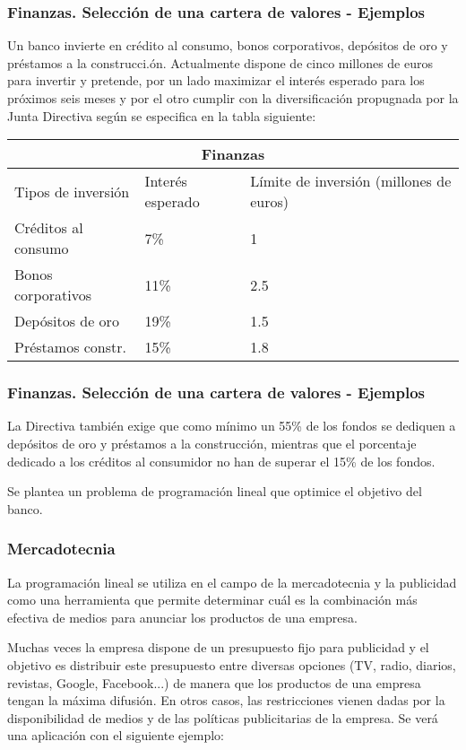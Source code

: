 \documentclass{beamer}
\begin{document}
\begin{frame}
\frametitle{Finanzas. Selecci\'on de una cartera de valores - Ejemplos}
Un banco invierte en cr\'edito al consumo, bonos corporativos, dep\'ositos de oro y pr\'estamos a la construcci.\'on. Actualmente dispone de cinco millones de euros para invertir y pretende, por un lado maximizar el inter\'es esperado para los pr\'oximos seis meses y por el otro cumplir con la diversificaci\'on propugnada por la Junta Directiva seg\'un se especifica en la tabla siguiente:

\begin{tabular}{ |p{3.3cm}||p{3cm}|p{3cm}|  }
 \hline
 \multicolumn{3}{|c|}{Finanzas} \\
 \hline
 Tipos de inversi\'on& Inter\'es esperado &L\'imite de inversi\'on (millones de euros)\\
 \hline
 Cr\'editos al consumo   & 7\%    &1\\
 Bonos corporativos   & 11\%    &2.5\\
 Dep\'ositos de oro   & 19\%    &1.5\\
 Pr\'estamos constr. & 15\%    &1.8\\
    \hline
\end{tabular}

\end{frame}


\begin{frame}
\frametitle{Finanzas. Selecci\'on de una cartera de valores - Ejemplos}

La Directiva tambi\'en exige que como m\'inimo un 55\% de los fondos se dediquen a dep\'ositos de oro y pr\'estamos a la construcci\'on, mientras que el porcentaje dedicado a los cr\'editos al consumidor no han de superar el 15\% de los fondos.

Se plantea un problema de programaci\'on lineal que optimice el objetivo del banco.
\end{frame}


\begin{frame}
\frametitle{Mercadotecnia}


La programaci\'on lineal se utiliza en el campo de la mercadotecnia y la publicidad como una herramienta que permite determinar cu\'al es la combinaci\'on m\'as efectiva de medios para anunciar los productos de una empresa.

Muchas veces la empresa dispone de un presupuesto fijo para publicidad y el objetivo es distribuir este presupuesto entre diversas opciones (TV, radio, diarios, revistas, Google, Facebook...) de manera que los productos de una empresa tengan la m\'axima difusi\'on. En otros casos, las restricciones vienen dadas por la disponibilidad de medios y de las pol\'iticas publicitarias de la empresa. Se ver\'a una aplicaci\'on con el siguiente ejemplo:
\end{frame}
\end{document}
